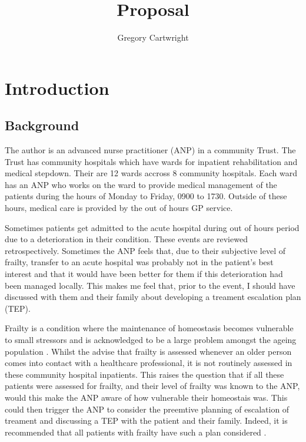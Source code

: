 \documentclass[12pt,a4paper,oneside,titlepage]{article}
\begin{document}
\author{Gregory Cartwright}
\title{Proposal}
\section*{Introduction}

\subsection*{Background}
The author is an advanced nurse practitioner (ANP) in a community Trust.
The Trust has community hospitals which have wards for inpatient rehabilitation and
medical stepdown. Their are 12 wards accross 8 community hospitals. Each ward has
an ANP who works on the ward to provide medical management of the patients during 
the hours of Monday to Friday, 0900 to 1730. Outside of these hours, medical care 
is provided by the out of hours GP service.

Sometimes patients get admitted to the acute hospital during out of hours period due to a 
deterioration in their condition.
These events are reviewed retrospectively. Sometimes the ANP feels that, 
due to their subjective level of frailty, transfer 
to an acute hospital was probably not in the patient's best interest and that it
would have been better for them if this deterioration had been managed locally.
This makes me feel that, prior to the event, I should have discussed with them and
their family about developing a treament escalation plan (TEP).

Frailty is a condition where the maintenance of homeostasis becomes vulnerable to 
small stressors and is acknowledged to be a large problem amongst the ageing population 
\parencite{clegg:13}.
Whilst the \textcite{bgs:14} advise that frailty is assessed whenever an older person
comes into contact with a healthcare professional, it is not routinely assessed 
in these community hospital inpatients. This raises the question that if all these 
patients were assessed for frailty, and their level of frailty was known to the ANP,
would this make the ANP aware of how vulnerable their homeostais was.
This could then trigger the ANP to consider the preemtive planning of escalation
of treament and discussing a TEP with the patient and their family. Indeed,
it is recommended that all patients with frailty have such a plan considered
\parencite{bgs:14}.
\end{document}
